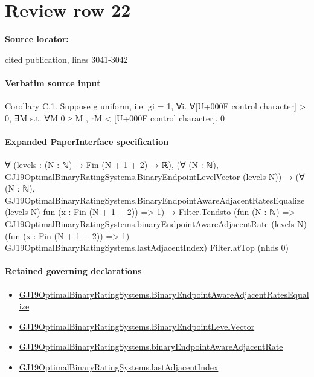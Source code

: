 \documentclass[10pt]{article}
\begin{document}
\section*{Review row 22}
\textbf{Source locator:} {\footnotesize\raggedright cited publication, lines 3041-\allowbreak{}3042\par}
\paragraph{Verbatim source input}
\begin{ReviewVerbatim}
Corollary C.1. Suppose g uniform, i.e. gi = 1, ∀i. ∀[U+000F control character] > 0, ∃M s.t. ∀M 0 ≥ M , rM < [U+000F control character].
0
\end{ReviewVerbatim}



\paragraph{Expanded PaperInterface specification}
\begin{ReviewVerbatim}
∀ (levels : (N : ℕ) → Fin (N + 1 + 2) → ℝ),
  (∀ (N : ℕ), GJ19OptimalBinaryRatingSystems.BinaryEndpointLevelVector (levels N)) →
    (∀ (N : ℕ),
        GJ19OptimalBinaryRatingSystems.BinaryEndpointAwareAdjacentRatesEqualize (levels N) fun (x : Fin (N + 1 + 2)) =>
          1) →
      Filter.Tendsto
        (fun (N : ℕ) =>
          GJ19OptimalBinaryRatingSystems.binaryEndpointAwareAdjacentRate (levels N) (fun (x : Fin (N + 1 + 2)) => 1)
            GJ19OptimalBinaryRatingSystems.lastAdjacentIndex)
        Filter.atTop (nhds 0)
\end{ReviewVerbatim}

\paragraph{Retained governing declarations}
\begin{itemize}\raggedright
\item \hyperlink{governing-declaration-5a62c276eedad684}{GJ19\allowbreak{}Optimal\allowbreak{}Binary\allowbreak{}Rating\allowbreak{}Systems.\allowbreak{}Binary\allowbreak{}Endpoint\allowbreak{}Aware\allowbreak{}Adjacent\allowbreak{}Rates\allowbreak{}Equalize}
\item \hyperlink{governing-declaration-aa797f827cdcda67}{GJ19\allowbreak{}Optimal\allowbreak{}Binary\allowbreak{}Rating\allowbreak{}Systems.\allowbreak{}Binary\allowbreak{}Endpoint\allowbreak{}Level\allowbreak{}Vector}
\item \hyperlink{paper-prerequisite-a9dcc8b00689fd3f}{GJ19\allowbreak{}Optimal\allowbreak{}Binary\allowbreak{}Rating\allowbreak{}Systems.\allowbreak{}binary\allowbreak{}Endpoint\allowbreak{}Aware\allowbreak{}Adjacent\allowbreak{}Rate}
\item \hyperlink{governing-declaration-52fd1b4c72f89380}{GJ19\allowbreak{}Optimal\allowbreak{}Binary\allowbreak{}Rating\allowbreak{}Systems.\allowbreak{}last\allowbreak{}Adjacent\allowbreak{}Index}
\end{itemize}
\end{document}
